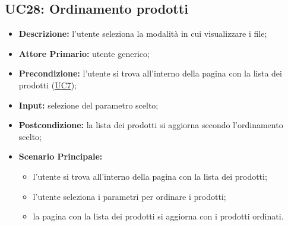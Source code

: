 \subsection{UC28: Ordinamento prodotti}
\label{sec:UC28}
\begin{itemize}
    \item \textbf{Descrizione:} l'utente seleziona la modalità in cui visualizzare i file;
    \item \textbf{Attore Primario:} utente generico;
    \item \textbf{Precondizione:} l'utente si trova all'interno della pagina con la lista dei prodotti (\hyperref[sec:UC7]{\underline{UC7}});
    \item \textbf{Input:} selezione del parametro scelto;
    \item \textbf{Postcondizione:} la lista dei prodotti si aggiorna secondo l'ordinamento scelto;
    \item \textbf{Scenario Principale:}
          \begin{itemize}
              \item l'utente si trova all'interno della pagina con la lista dei prodotti;
              \item l'utente seleziona i parametri per ordinare i prodotti;
              \item la pagina con la lista dei prodotti si aggiorna con i prodotti ordinati.
          \end{itemize}
\end{itemize}